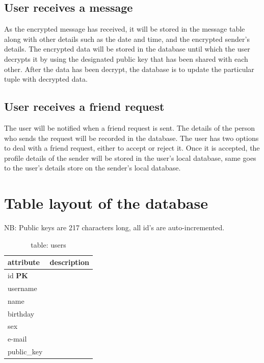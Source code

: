 \subsection{User receives a message} %
As the encrypted message has received, it will be stored in the message table along with other details such as the date and time, and the encrypted sender's details. The encrypted data will be stored in the database until which the user decrypts it by using the designated public key that has been shared with each other. After the data has been decrypt, the database is to update the particular tuple with decrypted data.

\subsection{User receives a friend request}
The user will be notified when a friend request is sent. The details of the person who sends the request will be recorded in the database. The user has two options to deal with a friend request, either to accept or reject it. Once it is accepted, the profile details of the sender will be stored in the user's local database, same goes to the user's details store on the sender's local database.

\section{Table layout of the database}
NB: Public keys are 217 characters long, all id's are auto-incremented.

\begin{table}[h]
    \centering
    \begin{tabular}{ll}
    attribute      & description\\ \hline
    id \textbf{PK} & \\
    username       & \\
    name           & \\
    birthday       & \\
    sex            & \\
    e-mail         & \\
    public\_key    & \\
    \end{tabular}
    \caption{table: users}
\end{table}


